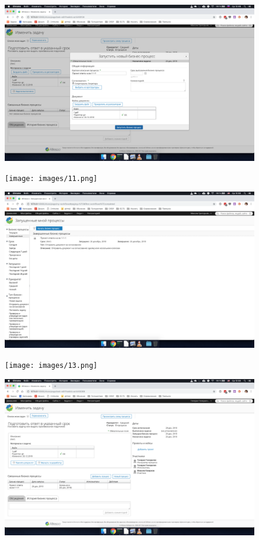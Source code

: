 \begin{figure}[H]
	\centering
	\includegraphics[width=.8\textwidth]{images/10.png}
\end{figure}

\begin{figure}[H]
	\centering
	\texttt{[image: images/11.png]}
\end{figure}

\begin{figure}[H]
	\centering
	\includegraphics[width=.8\textwidth]{images/12.png}
\end{figure}

\begin{figure}[H]
	\centering
	\texttt{[image: images/13.png]}
\end{figure}

\begin{figure}[H]
	\centering
	\includegraphics[width=.8\textwidth]{images/14.png}
\end{figure}
